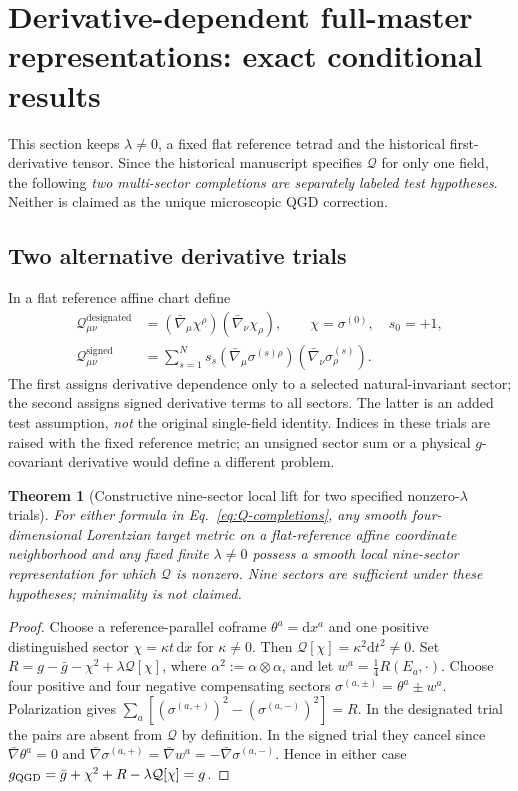 \documentclass[11pt,a4paper]{article}
\newcommand{\dd}{\mathrm d}
\newtheorem{theorem}{Theorem}[section]
\begin{document}
\section{Derivative-dependent full-master representations: exact conditional results}\label{sec:derivative-existence}
This section keeps \(\lambda\ne0\), a fixed flat reference tetrad and the historical first-derivative tensor. Since the historical manuscript specifies \(\mathcal Q\) for only one field, the following \emph{two multi-sector completions are separately labeled test hypotheses}. Neither is claimed as the unique microscopic QGD correction.

\subsection{Two alternative derivative trials}
In a flat reference affine chart define
\begin{align}\label{eq:Q-completions}
\mathcal Q_{\mu\nu}^{\mathrm{designated}}&=(\bar\nabla_\mu\chi^\rho)(\bar\nabla_\nu\chi_\rho),\qquad \chi=\sigma^{(0)},\quad s_0=+1,\\
\mathcal Q_{\mu\nu}^{\mathrm{signed}}&=\sum_{s=1}^N s_s(\bar\nabla_\mu\sigma^{(s)\rho})(\bar\nabla_\nu\sigma_\rho^{(s)}).
\end{align}
The first assigns derivative dependence only to a selected natural-invariant sector; the second assigns signed derivative terms to all sectors. The latter is an added test assumption, \emph{not} the original single-field identity. Indices in these trials are raised with the fixed reference metric; an unsigned sector sum or a physical \(g\)-covariant derivative would define a different problem.

\begin{theorem}[Constructive nine-sector local lift for two specified nonzero-\(\lambda\) trials]\label{thm:full-nine}
For either formula in Eq.~\eqref{eq:Q-completions}, any smooth four-dimensional Lorentzian target metric on a flat-reference affine coordinate neighborhood and any fixed finite \(\lambda\ne0\) possess a smooth local nine-sector representation for which \(\mathcal Q\) is nonzero. Nine sectors are sufficient under these hypotheses; minimality is not claimed.
\end{theorem}
\begin{proof}
Choose a reference-parallel coframe \(\theta^a=\dd x^a\) and one positive distinguished sector \(\chi=\kappa t\,\dd x\) for \(\kappa\ne0\). Then \(\mathcal Q[\chi]=\kappa^2\dd t^2\ne0\). Set \(R=g-\bar g-\chi^2+\lambda\mathcal Q[\chi]\), where \(\alpha^2:=\alpha\otimes\alpha\), and let \(w^a=\tfrac14 R(E_a,\cdot)\). Choose four positive and four negative compensating sectors \(\sigma^{(a,\pm)}=\theta^a\pm w^a\). Polarization gives \(\sum_a[(\sigma^{(a,+)})^2-(\sigma^{(a,-)})^2]=R\). In the designated trial the pairs are absent from \(\mathcal Q\) by definition. In the signed trial they cancel since \(\bar\nabla\theta^a=0\) and \(\bar\nabla\sigma^{(a,+)}=\bar\nabla w^a=-\bar\nabla\sigma^{(a,-)}\). Hence in either case
\(g_{\rm QGD}=\bar g+\chi^2+R-\lambda\mathcal Q[\chi]=g\).
\end{proof}
\end{document}

